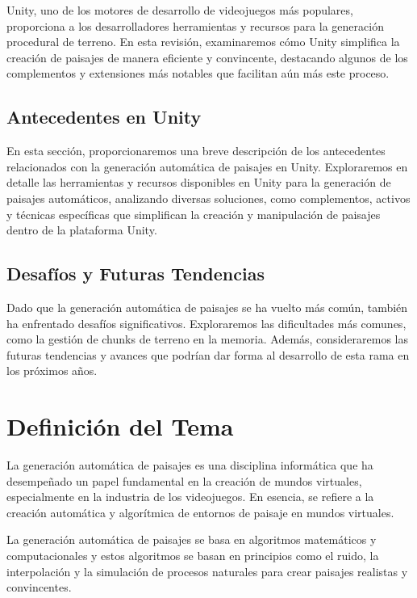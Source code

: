 Unity, uno de los motores de desarrollo de videojuegos más populares, proporciona a los desarrolladores herramientas y recursos para la generación procedural de terreno. En esta revisión, examinaremos cómo Unity simplifica la creación de paisajes de manera eficiente y convincente, destacando algunos de los complementos y extensiones más notables que facilitan aún más este proceso.

\subsection{Antecedentes en Unity}

En esta sección, proporcionaremos una breve descripción de los antecedentes relacionados con la generación automática de paisajes en Unity. Exploraremos en detalle las herramientas y recursos disponibles en Unity para la generación de paisajes automáticos, analizando diversas soluciones, como complementos, activos y técnicas específicas que simplifican la creación y manipulación de paisajes dentro de la plataforma Unity.

\subsection{Desafíos y Futuras Tendencias}

Dado que la generación automática de paisajes se ha vuelto más común, también ha enfrentado desafíos significativos. Exploraremos las dificultades más comunes, como la gestión de chunks de terreno en la memoria. Además, consideraremos las futuras tendencias y avances que podrían dar forma al desarrollo de esta rama en los próximos años.

\section{Definición del Tema}

La generación automática de paisajes es una disciplina informática que ha desempeñado un papel fundamental en la creación de mundos virtuales, especialmente en la industria de los videojuegos. En esencia, se refiere a la creación automática y algorítmica de entornos de paisaje en mundos virtuales.

La generación automática de paisajes se basa en algoritmos matemáticos y computacionales y estos algoritmos se basan en principios como el ruido, la interpolación y la simulación de procesos naturales para crear paisajes realistas y convincentes.

